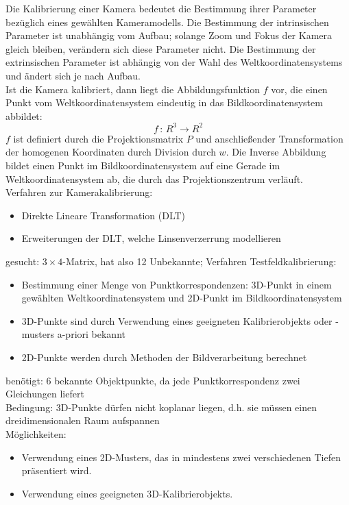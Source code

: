 Die Kalibrierung einer Kamera bedeutet die Bestimmung ihrer Parameter bezüglich eines gewählten Kameramodells. Die Bestimmung der intrinsischen Parameter ist unabhängig vom Aufbau; solange Zoom und Fokus der Kamera gleich bleiben, verändern sich diese Parameter nicht. Die Bestimmung der extrinsischen Parameter ist abhängig von der Wahl des Weltkoordinatensystems und ändert sich je nach Aufbau. \\
Ist die Kamera kalibriert, dann liegt die Abbildungsfunktion $f$ vor, die einen Punkt vom Weltkoordinatensystem eindeutig in das Bildkoordinatensystem abbildet: $$f \, : \, R^3 \to R^2$$
$f$ ist definiert durch die Projektionsmatrix $P$ und anschließender Transformation der homogenen Koordinaten durch Division durch $w$. Die Inverse Abbildung bildet einen Punkt im Bildkoordinatensystem auf eine Gerade im Weltkoordinatensystem ab, die durch das Projektionszentrum verläuft. \\[0,1cm]
Verfahren zur Kamerakalibrierung:
\begin{itemize}
\item Direkte Lineare Transformation (DLT)
\item Erweiterungen der DLT, welche Linsenverzerrung modellieren
\end{itemize}
gesucht: $3 \times 4$-Matrix, hat also 12 Unbekannte; Verfahren Testfeldkalibrierung:
\begin{itemize}
\item Bestimmung einer Menge von Punktkorrespondenzen: 3D-Punkt in einem gewählten Weltkoordinatensystem und 2D-Punkt im Bildkoordinatensystem
\item 3D-Punkte sind durch Verwendung eines geeigneten Kalibrierobjekts oder -musters a-priori bekannt
\item 2D-Punkte werden durch Methoden der Bildverarbeitung berechnet
\end{itemize}
benötigt: 6 bekannte Objektpunkte, da jede Punktkorrespondenz zwei Gleichungen liefert \\
Bedingung: 3D-Punkte dürfen nicht koplanar liegen, d.h. sie müssen einen dreidimensionalen Raum aufspannen \\
Möglichkeiten:
\begin{itemize}
\item Verwendung eines 2D-Musters, das in mindestens zwei verschiedenen Tiefen präsentiert wird.
\item Verwendung eines geeigneten 3D-Kalibrierobjekts.
\end{itemize}

